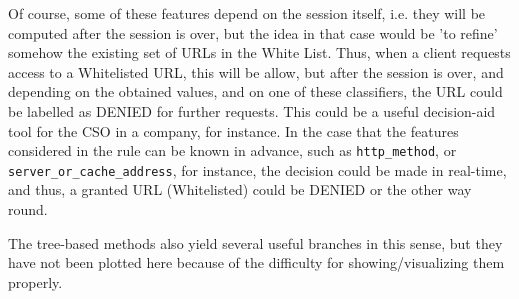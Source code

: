 \documentclass{llncs}
\begin{document}
Of course, some of these features depend on the session itself, i.e. they will be computed after the session is over, but the idea in that case would be 'to refine' somehow the existing set of URLs in the White List.
Thus, when a client requests access to a Whitelisted URL, this will be allow, but after the session is over, and depending on the obtained values, and on one of these classifiers, the URL could be labelled as DENIED for further requests.
This could be a useful decision-aid tool for the CSO in a company, for instance.
In the case that the features considered in the rule can be known in advance, such as \texttt{http\_method}, or \texttt{server\_or\_cache\_address}, for instance, the decision could be made in real-time, and thus, a granted URL (Whitelisted) could be DENIED or the other way round.

The tree-based methods also yield several useful branches in this sense, but they have not been plotted here because of the difficulty for showing/visualizing them properly.

%
%
%
%
%
%
%
%
%
%
%
%
%
%
%



% 
\end{document}
